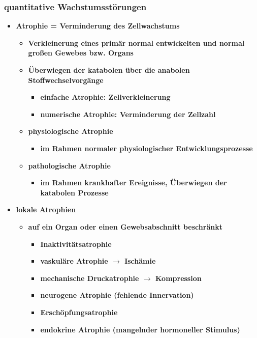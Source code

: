 \subsubsection{quantitative Wachstumsstörungen}
	\begin{itemize}
		\item \textbf{Atrophie = Verminderung des Zellwachstums}
			\begin{itemize}
				\item \textbf{Verkleinerung eines primär normal entwickelten und normal großen Gewebes bzw. Organs}
				\item \textbf{Überwiegen der katabolen über die anabolen Stoffwechselvorgänge}
					\begin{itemize}
						\item \textbf{einfache Atrophie: Zellverkleinerung}
						\item \textbf{numerische Atrophie: Verminderung der Zellzahl}
					\end{itemize}
				\item \textbf{physiologische Atrophie}
					\begin{itemize}
						\item \textbf{im Rahmen normaler physiologischer Entwicklungsprozesse}
					\end{itemize}
				\item \textbf{pathologische Atrophie}
					\begin{itemize}
						\item \textbf{im Rahmen krankhafter Ereignisse, Überwiegen der katabolen Prozesse}
					\end{itemize}
			\end{itemize}
\pagebreak
		\item \textbf{lokale Atrophien}
			\begin{itemize}
				\item \textbf{auf ein Organ oder einen Gewebsabschnitt beschränkt}
					\begin{itemize}
						\item \textbf{Inaktivitätsatrophie}
						\item \textbf{vaskuläre Atrophie $\rightarrow$ Ischämie}
						\item \textbf{mechanische Druckatrophie $\rightarrow$ Kompression}
						\item \textbf{neurogene Atrophie (fehlende Innervation)}
						\item \textbf{Erschöpfungsatrophie}
						\item \textbf{endokrine Atrophie (mangelnder hormoneller Stimulus)}

\end{itemize}
\end{itemize}
\end{itemize}
